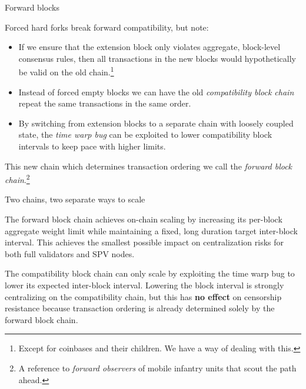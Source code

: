 \documentclass[10pt]{beamer}
\begin{document}
\begin{frame}{Forward blocks}

  Forced hard forks break forward compatibility, but note:

  \begin{itemize}

  \item If we ensure that the extension block only violates aggregate,
    block-level consensus rules, then all transactions in the new
    blocks would hypothetically be valid on the old
    chain.\footnote{Except for coinbases and their children.  We have
      a way of dealing with this.}

  \item Instead of forced empty blocks we can have the old
    \emph{compatibility block chain} repeat the same transactions in
    the same order.

  \item By switching from extension blocks to a separate chain with
    loosely coupled state, the \emph{time warp bug} can be exploited
    to lower compatibility block intervals to keep pace with higher
    limits.

  \end{itemize}

  This new chain which determines transaction ordering we call the
  \emph{forward block chain}.\footnote{A reference to \emph{forward
      observers} of mobile infantry units that scout the path ahead.}

\end{frame}

\begin{frame}{Two chains, two separate ways to scale}

  The forward block chain achieves on-chain scaling by increasing its
  per-block aggregate weight limit while maintaining a fixed, long
  duration target inter-block interval.  This achieves the smallest
  possible impact on centralization risks for both full validators and
  SPV nodes.

  The compatibility block chain can only scale by exploiting the time
  warp bug to lower its expected inter-block interval.  Lowering the
  block interval is strongly centralizing on the compatibility chain,
  but this has \textbf{no effect} on censorship resistance because
  transaction ordering is already determined solely by the forward
  block chain.\footnotemark


\end{frame}
\end{document}
